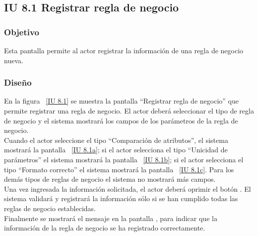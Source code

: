 \newpage 
\subsection{IU 8.1 Registrar regla de negocio}

\subsubsection{Objetivo}
	
	Esta pantalla permite al actor registrar la información de una regla de negocio nueva.

\subsubsection{Diseño}

    En la figura ~\ref{IU 8.1} se muestra la pantalla ``Registrar regla de negocio'' que permite registrar una regla de negocio. El actor deberá 
    seleccionar el tipo de regla de negocio y el sistema mostrará los campos de los parámetros de la regla de negocio. \\
    
    Cuando el actor seleccione el tipo ``Comparación de atributos'', el sistema mostrará la pantalla ~\ref{IU 8.1a}; si el actor selecciona el tipo
    ``Unicidad de parámetros'' el sistema mostrará la pantalla ~\ref{IU 8.1b}; si el actor selecciona el tipo ``Formato correcto'' el sistema
    mostrará la pantalla ~\ref{IU 8.1c}. Para los demás tipos de reglas de negocio el sistema no mostrará más campos.\\
    
    Una vez ingresada la información solicitada, el actor deberá oprimir el botón . El sistema validará y registrará la 
    información sólo si se han cumplido todas las reglas de negocio establecidas.  \\
    
    Finalmente se mostrará el mensaje  en la pantalla , 
    para indicar que la información de la regla de negocio
    se ha registrado correctamente.        



